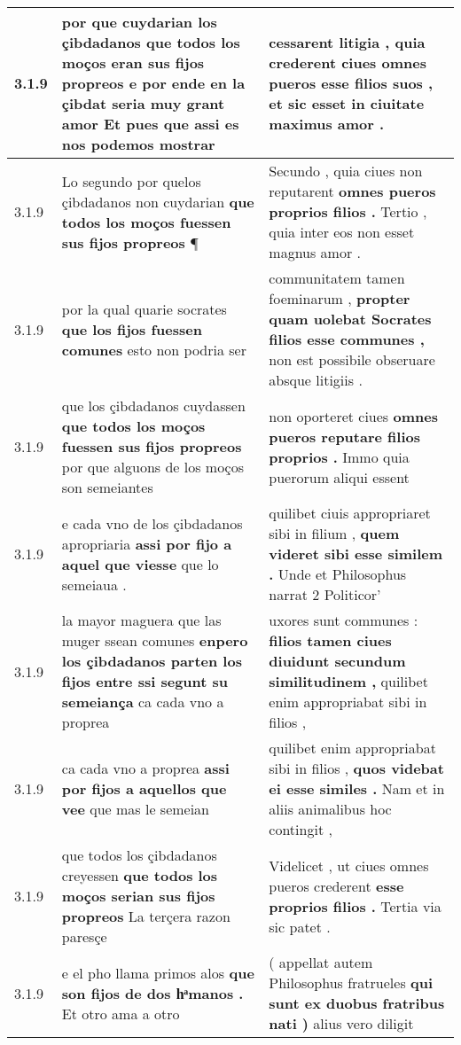 \begin{tabular}{|p{1cm}|p{6.5cm}|p{6.5cm}|}
3.1.9 & por que cuydarian los çibdadanos \textbf{ que todos los moços eran sus fijos propreos } e por ende en la çibdat seria muy grant amor Et pues que assi es nos podemos mostrar & cessarent litigia , \textbf{ quia crederent ciues omnes pueros esse filios suos , } et sic esset in ciuitate maximus amor . \\\hline
3.1.9 & Lo segundo por quelos çibdadanos non cuydarian \textbf{ que todos los moços fuessen sus fijos propreos } ¶ & Secundo , quia ciues non reputarent \textbf{ omnes pueros proprios filios . } Tertio , quia inter eos non esset magnus amor . \\\hline
3.1.9 & por la qual quarie socrates \textbf{ que los fijos fuessen comunes } esto non podria ser & communitatem tamen foeminarum , \textbf{ propter quam uolebat Socrates filios esse communes , } non est possibile obseruare absque litigiis . \\\hline
3.1.9 & que los çibdadanos cuydassen \textbf{ que todos los moços fuessen sus fijos propreos } por que alguons de los moços son semeiantes & non oporteret ciues \textbf{ omnes pueros reputare filios proprios . } Immo quia puerorum aliqui essent \\\hline
3.1.9 & e cada vno de los çibdadanos apropriaria \textbf{ assi por fijo a aquel que viesse } que lo semeiaua . & quilibet ciuis appropriaret sibi in filium , \textbf{ quem videret sibi esse similem . } Unde et Philosophus narrat 2 Politicor’ \\\hline
3.1.9 & la mayor maguera que las muger ssean comunes \textbf{ enpero los çibdadanos parten los fijos entre ssi segunt su semeiança } ca cada vno a proprea & uxores sunt communes : \textbf{ filios tamen ciues diuidunt secundum similitudinem , } quilibet enim appropriabat sibi in filios , \\\hline
3.1.9 & ca cada vno a proprea \textbf{ assi por fijos a aquellos que vee } que mas le semeian & quilibet enim appropriabat sibi in filios , \textbf{ quos videbat ei esse similes . } Nam et in aliis animalibus hoc contingit , \\\hline
3.1.9 & que todos los çibdadanos creyessen \textbf{ que todos los moços serian sus fijos propreos } La terçera razon paresçe & Videlicet , ut ciues omnes pueros crederent \textbf{ esse proprios filios . } Tertia via sic patet . \\\hline
3.1.9 & e el pho llama primos alos \textbf{ que son fijos de dos hͣmanos . } Et otro ama a otro & ( appellat autem Philosophus fratrueles \textbf{ qui sunt ex duobus fratribus nati ) } alius vero diligit \\\hline

\end{tabular}
